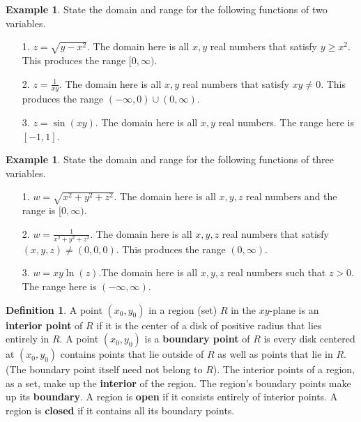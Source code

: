 \documentclass[12pt, letter]{article}
\theoremstyle{plain}
\numberwithin{theorem}{section}
\theoremstyle{definition}
\newtheorem{definition}[theorem]{Definition}
\newtheorem{example}[theorem]{Example}
\begin{document}
\bigskip

\hrulefill

\bigskip

\begin{example}
State the domain and range for the following functions of two variables.\\

\smallskip

\begin{itemize}
\item[1.] $z= \sqrt{y-x^2}$. The domain here is all $x,y$ real numbers that satisfy $y\geq x^2$. This produces the range $[0,\infty)$.
\item[2.] $z=\frac{1}{xy}$. The domain here is all $x,y$ real numbers that satisfy $xy\neq 0$. This produces the range $(-\infty, 0) \cup (0,\infty)$.
\item[3.] $z=\sin(xy)$. The domain here is all $x,y$ real numbers. The range here is $[-1,1]$.
\end{itemize}
\end{example}

\bigskip

\hrulefill

\bigskip

\begin{example}
State the domain and range for the following functions of three variables.\\

\smallskip

\begin{itemize}
\item[1.] $w= \sqrt{x^2+y^2+z^2}$. The domain here is all $x,y,z$ real numbers and the range is $[0,\infty)$.
\item[2.] $w=\frac{1}{x^2+y^2+z^2}$. The domain here is all $x,y,z$ real numbers that satisfy $(x,y,z)\neq (0,0,0)$. This produces the range $(0,\infty)$.
\item[3.] $w=xy\ln(z)$.The domain here is all $x,y,z$ real numbers such that $z>0$. The range here is $(-\infty,\infty)$.
\end{itemize}
\end{example}

\bigskip

\hrulefill

\bigskip

\begin{definition}
A point $(x_0,y_0)$ in a region (set) $R$ in the $xy$-plane is an \textbf{interior point} of $R$ if it is the center of a disk of positive radius that lies entirely in $R$. A point $(x_0,y_0)$ is a \textbf{boundary point} of $R$ is every disk centered at $(x_0,y_0)$ contains points that lie outside of $R$ as well as points that lie in $R$. (The boundary point itself need not belong to $R$). The interior points of a region, as a set, make up the \textbf{interior} of the region. The region's boundary points make up its \textbf{boundary}. A region is \textbf{open} if it consists entirely of interior points. A region is \textbf{closed} if it contains all its boundary points.
\end{definition}
\end{document}
